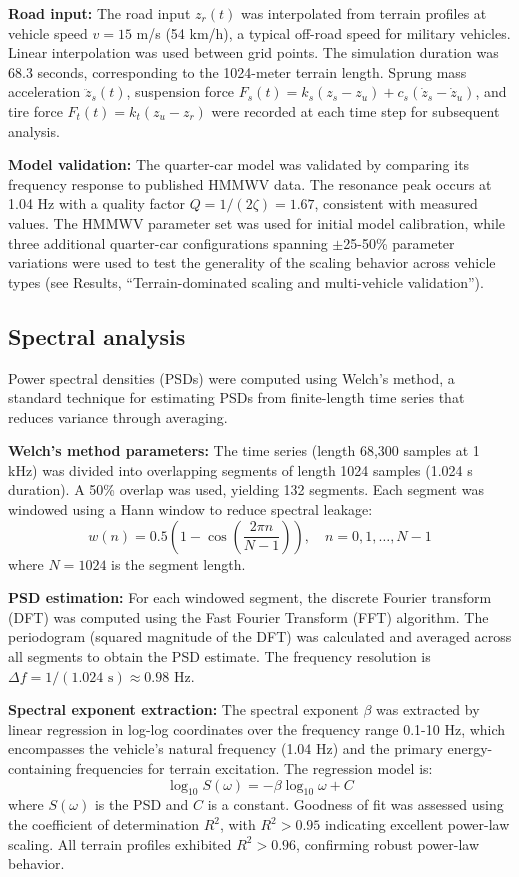 \documentclass[11pt]{article}
\begin{document}
\textbf{Road input:} The road input $z_r(t)$ was interpolated from terrain profiles at vehicle speed $v = 15$ m/s (54 km/h), a typical off-road speed for military vehicles. Linear interpolation was used between grid points. The simulation duration was 68.3 seconds, corresponding to the 1024-meter terrain length. Sprung mass acceleration $\ddot{z}_s(t)$, suspension force $F_s(t) = k_s(z_s - z_u) + c_s(\dot{z}_s - \dot{z}_u)$, and tire force $F_t(t) = k_t(z_u - z_r)$ were recorded at each time step for subsequent analysis.

\textbf{Model validation:} The quarter-car model was validated by comparing its frequency response to published HMMWV data. The resonance peak occurs at 1.04 Hz with a quality factor $Q = 1/(2\zeta) = 1.67$, consistent with measured values. The HMMWV parameter set was used for initial model calibration, while three additional quarter-car configurations spanning $\pm$25-50\% parameter variations were used to test the generality of the scaling behavior across vehicle types (see Results, ``Terrain-dominated scaling and multi-vehicle validation'').

\subsection*{Spectral analysis}

Power spectral densities (PSDs) were computed using Welch's method\cite{Welch1967}, a standard technique for estimating PSDs from finite-length time series that reduces variance through averaging.

\textbf{Welch's method parameters:} The time series (length 68,300 samples at 1 kHz) was divided into overlapping segments of length 1024 samples (1.024 s duration). A 50\% overlap was used, yielding 132 segments. Each segment was windowed using a Hann window to reduce spectral leakage:
\begin{equation}
w(n) = 0.5\left(1 - \cos\left(\frac{2\pi n}{N-1}\right)\right), \quad n = 0, 1, \ldots, N-1
\end{equation}
where $N = 1024$ is the segment length.

\textbf{PSD estimation:} For each windowed segment, the discrete Fourier transform (DFT) was computed using the Fast Fourier Transform (FFT) algorithm. The periodogram (squared magnitude of the DFT) was calculated and averaged across all segments to obtain the PSD estimate. The frequency resolution is $\Delta f = 1/(1.024 \text{ s}) \approx 0.98$ Hz.

\textbf{Spectral exponent extraction:} The spectral exponent $\beta$ was extracted by linear regression in log-log coordinates over the frequency range 0.1-10 Hz, which encompasses the vehicle's natural frequency (1.04 Hz) and the primary energy-containing frequencies for terrain excitation. The regression model is:
\begin{equation}
\log_{10} S(\omega) = -\beta \log_{10} \omega + C
\end{equation}
where $S(\omega)$ is the PSD and $C$ is a constant. Goodness of fit was assessed using the coefficient of determination $R^2$, with $R^2 > 0.95$ indicating excellent power-law scaling. All terrain profiles exhibited $R^2 > 0.96$, confirming robust power-law behavior.
\end{document}
